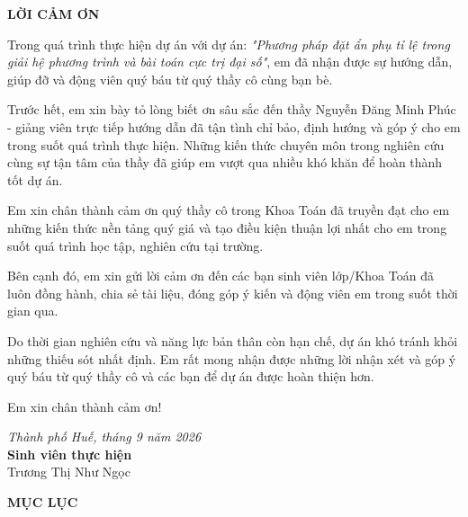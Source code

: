 \documentclass[12pt]{report}
\begin{document}
\fontsize{14pt}{18pt}\selectfont
\begin{center}
    \textbf{\Large LỜI CẢM ƠN}
\end{center}

\vspace{0.5cm}

\noindent Trong quá trình thực hiện dự án với dự án: \textit{"Phương pháp đặt ẩn phụ tỉ lệ trong giải hệ phương trình và bài toán cực trị đại số"}, em đã nhận được sự hướng dẫn, giúp đỡ và động viên quý báu từ quý thầy cô cùng bạn bè.

\vspace{0.3cm}
\noindent Trước hết, em xin bày tỏ lòng biết ơn sâu sắc đến thầy Nguyễn Đăng Minh Phúc - giảng viên trực tiếp hướng dẫn đã tận tình chỉ bảo, định hướng và góp ý cho em trong suốt quá trình thực hiện. Những kiến thức chuyên môn trong nghiên cứu cùng sự tận tâm của thầy đã giúp em vượt qua nhiều khó khăn để hoàn thành tốt dự án.

\vspace{0.3cm}
\noindent Em xin chân thành cảm ơn quý thầy cô trong Khoa Toán đã truyền đạt cho em những kiến thức nền tảng quý giá và tạo điều kiện thuận lợi nhất cho em trong suốt quá trình học tập, nghiên cứu tại trường.

\vspace{0.3cm}
\noindent Bên cạnh đó, em xin gửi lời cảm ơn đến các bạn sinh viên lớp/Khoa Toán đã luôn đồng hành, chia sẻ tài liệu, đóng góp ý kiến và động viên em trong suốt thời gian qua.

\vspace{0.3cm}
\noindent Do thời gian nghiên cứu và năng lực bản thân còn hạn chế, dự án khó tránh khỏi những thiếu sót nhất định. Em rất mong nhận được những lời nhận xét và góp ý quý báu từ quý thầy cô và các bạn để dự án được hoàn thiện hơn.

\vspace{0.3cm}
\noindent Em xin chân thành cảm ơn!

\vspace{1cm}
\begin{flushright}
    \textit{Thành phố Huế, tháng 9 năm 2026} \\
    \textbf{Sinh viên thực hiện} \\
    Trương Thị Như Ngọc
\end{flushright}
\newpage
\begin{center}
    \textbf{\Large MỤC LỤC}
\end{center}
\end{document}

